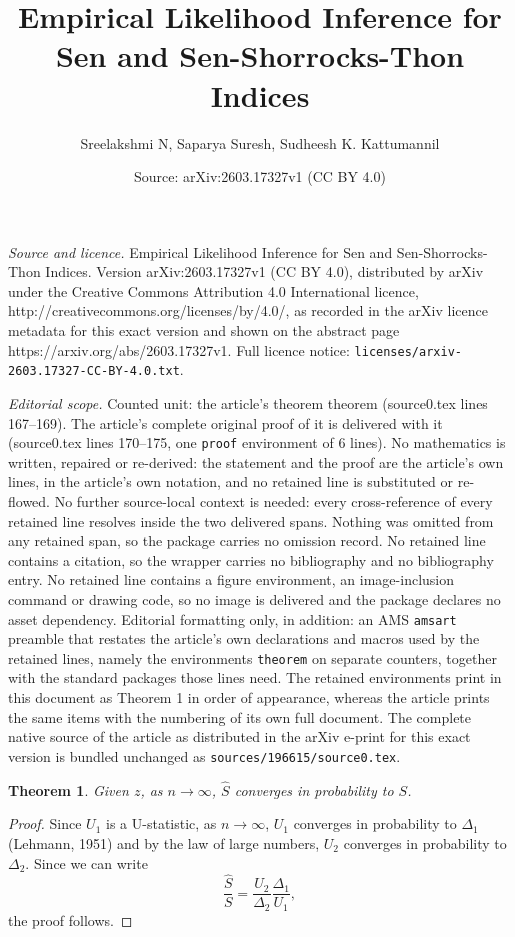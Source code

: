 \documentclass[10pt,a4paper]{amsart}
\title{Empirical Likelihood Inference for Sen and Sen-Shorrocks-Thon Indices}
\author{Sreelakshmi N, Saparya Suresh, Sudheesh K. Kattumannil}
\date{Source: arXiv:2603.17327v1 (CC BY 4.0)}
\newtheorem{theorem}{Theorem}
\begin{document}
\maketitle

\noindent\emph{Source and licence.} Empirical Likelihood Inference for Sen and Sen-Shorrocks-Thon Indices. Version arXiv:2603.17327v1 (CC BY 4.0), distributed by arXiv under the Creative Commons Attribution 4.0 International licence, http://creativecommons.org/licenses/by/4.0/, as recorded in the arXiv licence metadata for this exact version and shown on the abstract page https://arxiv.org/abs/2603.17327v1. Full licence notice: \texttt{licenses/arxiv-2603.17327-CC-BY-4.0.txt}.\par\smallskip

\noindent\textit{Editorial scope.} Counted unit: the article's theorem theorem (source0.tex lines 167--169). The article's complete original proof of it is delivered with it (source0.tex lines 170--175, one \texttt{proof} environment of 6 lines). No mathematics is written, repaired or re-derived: the statement and the proof are the article's own lines, in the article's own notation, and no retained line is substituted or re-flowed.  No further source-local context is needed: every cross-reference of every retained line resolves inside the two delivered spans.  Nothing was omitted from any retained span, so the package carries no omission record.  No retained line contains a citation, so the wrapper carries no bibliography and no bibliography entry.  No retained line contains a figure environment, an image-inclusion command or drawing code, so no image is delivered and the package declares no asset dependency.  Editorial formatting only, in addition: an AMS \texttt{amsart} preamble that restates the article's own declarations and macros used by the retained lines, namely the environments \texttt{theorem} on separate counters, together with the standard packages those lines need.  The retained environments print in this document as Theorem 1 in order of appearance, whereas the article prints the same items with the numbering of its own full document.  The complete native source of the article as distributed in the arXiv e-print for this exact version is bundled unchanged as \texttt{sources/196615/source0.tex}.
 \begin{theorem}
   Given $z$, as $n\rightarrow \infty$, $\widehat{S}$ converges in probability to $S$.
 \end{theorem}

\begin{proof}
    Since $U_1$ is a U-statistic, as $n\rightarrow\infty$, $U_1$ converges in probability to $\Delta_1$ (Lehmann, 1951) and by the law of large numbers, $U_2$ converges in probability to $\Delta_2.$  Since we can write
\begin{equation}
 \frac{\widehat{S}}{S}=\frac{U_2}{\Delta_2}\frac{\Delta_1}{U_1},
 \end{equation}the proof follows.
\end{proof}
\end{document}
